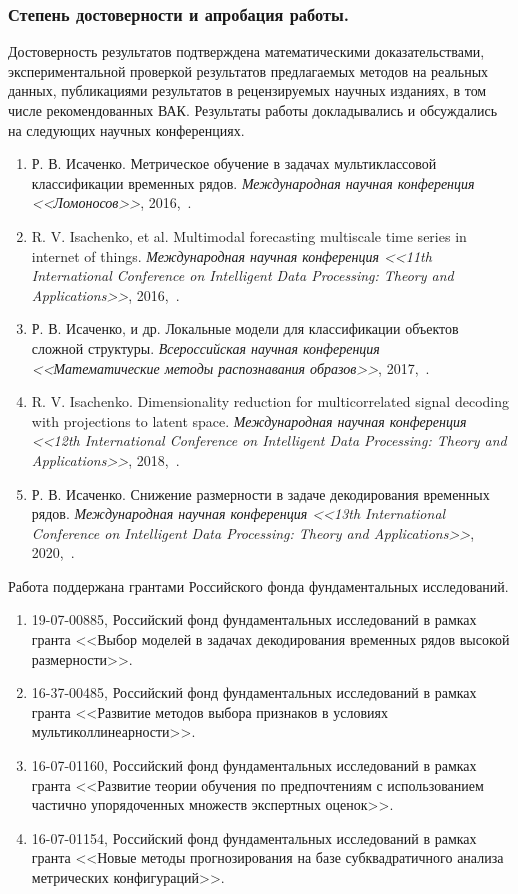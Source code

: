 \subsubsection{Степень достоверности и апробация работы.}
Достоверность результатов подтверждена математическими доказательствами, экспериментальной проверкой результатов предлагаемых методов на реальных данных, публикациями результатов в рецензируемых научных изданиях, в том числе рекомендованных ВАК. 
Результаты работы докладывались и обсуждались на следующих научных конференциях.
\begin{enumerate}
	\item Р. В. Исаченко. Метрическое обучение в задачах мультиклассовой классификации временных рядов. \textit{Международная научная конференция <<Ломоносов>>}, 2016,~\cite{isachenko2016lomonosov}.
	\item R. V. Isachenko, et al. Multimodal forecasting multiscale time series in internet of things. \textit{Международная научная конференция  <<11th International Conference on Intelligent Data Processing: Theory and Applications>>}, 2016,~\cite{Neychev2016IDP}.
	\item Р. В. Исаченко, и др. Локальные модели для классификации объектов сложной структуры. \textit{Всероссийская научная конференция <<Математические методы распознавания образов>>}, 2017,~\cite{isachenko2017localmmro}.
	\item R. V. Isachenko. Dimensionality reduction for multicorrelated signal decoding with projections to latent space. \textit{Международная научная конференция  <<12th International Conference on Intelligent Data Processing: Theory and Applications>>}, 2018,~\cite{Isachenko2018plsidp}.
	\item Р. В. Исаченко. Снижение размерности в задаче декодирования временных рядов. \textit{Международная научная конференция  <<13th International Conference on Intelligent Data Processing: Theory and Applications>>}, 2020,~\cite{Isachenko2020plsidp}.
\end{enumerate} 

Работа поддержана грантами Российского фонда фундаментальных исследований.
\begin{enumerate}
	\item 19-07-00885, Российский фонд фундаментальных исследований в рамках гранта <<Выбор моделей в задачах декодирования временных рядов высокой размерности>>.
	\item 16-37-00485, Российский фонд фундаментальных исследований в рамках гранта <<Развитие методов выбора признаков в условиях мультиколлинеарности>>.
	\item 16-07-01160, Российский фонд фундаментальных исследований в рамках гранта <<Развитие теории обучения по предпочтениям с использованием частично упорядоченных множеств экспертных оценок>>.
	\item 16-07-01154, Российский фонд фундаментальных исследований в рамках гранта <<Новые методы прогнозирования на базе субквадратичного анализа метрических конфигураций>>.
\end{enumerate}

